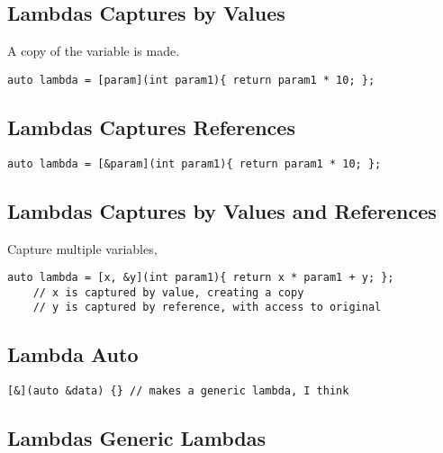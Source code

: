 \subsection{Lambdas Captures by Values}

A copy of the variable is made.

\begin{verbatim}
auto lambda = [param](int param1){ return param1 * 10; };
\end{verbatim}

\subsection{Lambdas Captures References}

\begin{verbatim}
auto lambda = [&param](int param1){ return param1 * 10; };
\end{verbatim}

\subsection{Lambdas Captures by Values and References}

Capture multiple variables, 

\begin{verbatim}
auto lambda = [x, &y](int param1){ return x * param1 + y; };
    // x is captured by value, creating a copy
    // y is captured by reference, with access to original
\end{verbatim}

\subsection{Lambda Auto}

\begin{verbatim}
[&](auto &data) {} // makes a generic lambda, I think
\end{verbatim}

\subsection{Lambdas Generic Lambdas}

